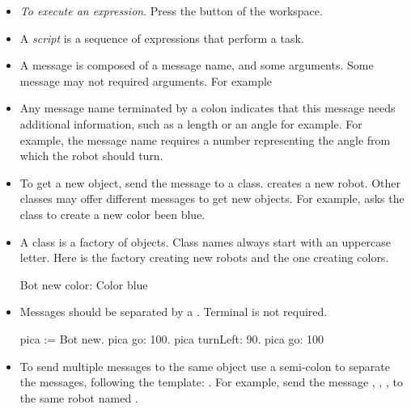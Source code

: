 \summa
\begin{itemize}
\item \emph{To execute an expression}. Press the  button of the workspace.




\item A \emph{script} is a sequence of expressions that perform a task.

\item A message is composed of a message name, and some arguments. Some message may not required arguments. For example  

\item Any message name terminated by a colon indicates that this message needs additional information, such as a length or an angle for example. For example, the message name  requires a number representing the angle from which the robot should turn.

\item To get a new object, send the message  to a class.  creates a new robot. Other classes  may offer different messages to get new objects. For example,  asks the class  to create a new  color been blue.


\item A class is a factory of objects. Class names always start with an uppercase letter. Here  is the factory creating new robots and  the one creating colors. \

\begin{nalltt}
Bot new color: Color blue
\end{nalltt}

\item Messages should be separated by a \period. Terminal \period is not required.\

\begin{nalltt}
pica := Bot new.
pica go: 100.
pica turnLeft: 90.
pica go: 100
\end{nalltt}


\item To send multiple messages to the same object use a semi-colon \ct{;} to separate the messages, following the template: . For example,  send the message , , ,  to the same robot named .
\end{itemize}







\ifx\wholebook\relax\else
\fi







\ifx\wholebook\relax\else\fi



